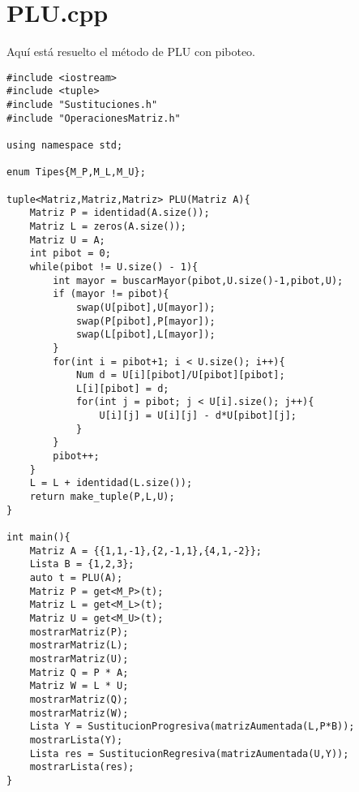 \documentclass[a4paper,12pt]{article}
\begin{document}
\section{PLU.cpp}

Aquí está resuelto el método de PLU con piboteo.

\begin{lstlisting}
#include <iostream>
#include <tuple>
#include "Sustituciones.h"
#include "OperacionesMatriz.h"

using namespace std;

enum Tipes{M_P,M_L,M_U};

tuple<Matriz,Matriz,Matriz> PLU(Matriz A){
	Matriz P = identidad(A.size());
	Matriz L = zeros(A.size());
	Matriz U = A;
	int pibot = 0;
	while(pibot != U.size() - 1){
		int mayor = buscarMayor(pibot,U.size()-1,pibot,U);
		if (mayor != pibot){
			swap(U[pibot],U[mayor]);		
			swap(P[pibot],P[mayor]);
			swap(L[pibot],L[mayor]);
		} 
		for(int i = pibot+1; i < U.size(); i++){
			Num d = U[i][pibot]/U[pibot][pibot];
			L[i][pibot] = d;
			for(int j = pibot; j < U[i].size(); j++){
				U[i][j] = U[i][j] - d*U[pibot][j];
			}
		}
		pibot++;
	}
	L = L + identidad(L.size());
	return make_tuple(P,L,U);
}

int main(){
	Matriz A = {{1,1,-1},{2,-1,1},{4,1,-2}};
	Lista B = {1,2,3};
	auto t = PLU(A);
	Matriz P = get<M_P>(t);
	Matriz L = get<M_L>(t);
	Matriz U = get<M_U>(t);
	mostrarMatriz(P);
	mostrarMatriz(L);
	mostrarMatriz(U);
	Matriz Q = P * A;
	Matriz W = L * U;
	mostrarMatriz(Q);
	mostrarMatriz(W);
	Lista Y = SustitucionProgresiva(matrizAumentada(L,P*B));
	mostrarLista(Y);
	Lista res = SustitucionRegresiva(matrizAumentada(U,Y));
	mostrarLista(res);
}
\end{lstlisting}
\end{document}
